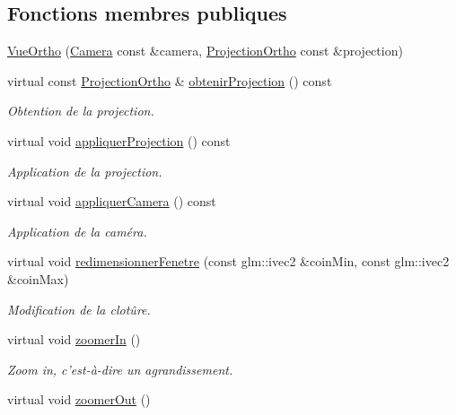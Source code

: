\subsection*{Fonctions membres publiques}
\begin{DoxyCompactItemize}
\item 
\hyperlink{classvue_1_1_vue_ortho_a6bfb00557ce06ac18b021650a15ded67}{Vue\-Ortho} (\hyperlink{classvue_1_1_camera}{Camera} const \&camera, \hyperlink{classvue_1_1_projection_ortho}{Projection\-Ortho} const \&projection)
\item 
virtual const \hyperlink{classvue_1_1_projection_ortho}{Projection\-Ortho} \& \hyperlink{classvue_1_1_vue_ortho_a732dee29813a40b6404eb7ed06287a8e}{obtenir\-Projection} () const 
\begin{DoxyCompactList}\small\item\em Obtention de la projection. \end{DoxyCompactList}\item 
virtual void \hyperlink{classvue_1_1_vue_ortho_a188cf5eb7c0a24536d1ab73b18f93f63}{appliquer\-Projection} () const 
\begin{DoxyCompactList}\small\item\em Application de la projection. \end{DoxyCompactList}\item 
virtual void \hyperlink{classvue_1_1_vue_ortho_aff568cb715637b0407076279fac672ff}{appliquer\-Camera} () const 
\begin{DoxyCompactList}\small\item\em Application de la caméra. \end{DoxyCompactList}\item 
virtual void \hyperlink{classvue_1_1_vue_ortho_ad2e8ccf82efadbc00c2900eb5e549d6f}{redimensionner\-Fenetre} (const glm\-::ivec2 \&coin\-Min, const glm\-::ivec2 \&coin\-Max)
\begin{DoxyCompactList}\small\item\em Modification de la clotûre. \end{DoxyCompactList}\item 
virtual void \hyperlink{classvue_1_1_vue_ortho_a9d43decb227db8bf71905227904b6953}{zoomer\-In} ()
\begin{DoxyCompactList}\small\item\em Zoom in, c'est-\/à-\/dire un agrandissement. \end{DoxyCompactList}\item 
virtual void \hyperlink{classvue_1_1_vue_ortho_a16855ff46992fd6ff9e306058f90924a}{zoomer\-Out} ()

\end{DoxyCompactItemize}
